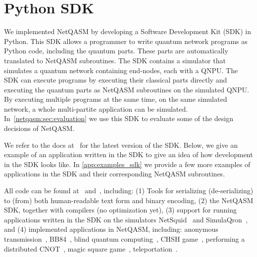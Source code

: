 \section{Python SDK}
\label{netqasm:sec:python-sdk}
We implemented \ac{NetQASM} by developing a Software Development Kit (SDK) in Python.
This SDK allows a programmer to write quantum network programs as Python code, including the quantum parts.
These parts are automatically translated to NetQASM subroutines.
The SDK contains a simulator that simulates a quantum network containing end-nodes, each with a \ac{QNPU}.
The SDK can execute programs by executing their classical parts directly and executing the quantum parts as \ac{NetQASM} subroutines on the simulated \ac{QNPU}.
By executing multiple programs at the same time, on the same simulated network, a whole multi-partite application can be simulated.
In~\cref{netqasm:sec:evaluation} we use this SDK to evaluate some of the design decisions of \ac{NetQASM}.

We refer to the docs at~\cite{git_netqasm} for the latest version of the SDK.
Below, we give an example of an application written in the SDK to give an idea of how development in the SDK looks like.
In \cref{app:examples_sdk} we provide a few more examples of applications in the SDK and their corresponding \ac{NetQASM} subroutines.

All code can be found at~\cite{git_netqasm} and~\cite{git_squidasm}, including:
    (1) Tools for serializing (de-serializing) to (from) both human-readable text form and binary encoding,
    (2) the \ac{NetQASM} SDK, together with compilers (no optimization yet),
    (3) support for running applications written in the SDK on the simulators NetSquid~\cite{netsquid,coopmans2021netsquid} and SimulaQron~\cite{dahlberg2018simulaqron}, and
    (4) implemented applications in \ac{NetQASM}, including: anonymous transmission~\cite{Christandl2005anonymous}, BB84~\cite{bb84}, blind quantum computing~\cite{broadbent2009universal,fitzsimons2017unconditionally}, CHSH game~\cite{Kaniewski2016}, performing a distributed CNOT~\cite{denchev2008distributed}, magic square game~\cite{brassard1999magicsquare}, teleportation~\cite{bennett1993teleporting}.

